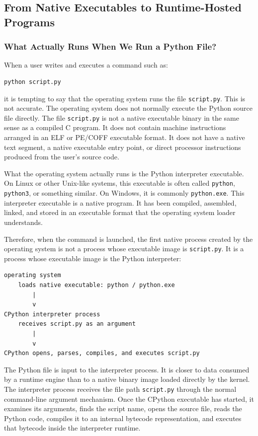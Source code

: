 \documentclass[a4paper,twoside]{report}
\begin{document}
\subsection{From Native Executables to Runtime-Hosted Programs}


\subsubsection{What Actually Runs When We Run a Python File?}

When a user writes and executes a command such as:

\begin{verbatim}
python script.py
\end{verbatim}

it is tempting to say that the operating system runs the file \texttt{script.py}. This is not accurate. The operating system does not normally execute the Python source file directly. The file \texttt{script.py} is not a native executable binary in the same sense as a compiled C program. It does not contain machine instructions arranged in an ELF or PE/COFF executable format. It does not have a native text segment, a native executable entry point, or direct processor instructions produced from the user's source code.

What the operating system actually runs is the Python interpreter executable. On Linux or other Unix-like systems, this executable is often called \texttt{python}, \texttt{python3}, or something similar. On Windows, it is commonly \texttt{python.exe}. This interpreter executable is a native program. It has been compiled, assembled, linked, and stored in an executable format that the operating system loader understands.

Therefore, when the command is launched, the first native process created by the operating system is not a process whose executable image is \texttt{script.py}. It is a process whose executable image is the Python interpreter:

\begin{verbatim}
operating system
    loads native executable: python / python.exe
        |
        v
CPython interpreter process
    receives script.py as an argument
        |
        v
CPython opens, parses, compiles, and executes script.py
\end{verbatim}

The Python file is input to the interpreter process. It is closer to data consumed by a runtime engine than to a native binary image loaded directly by the kernel. The interpreter process receives the file path \texttt{script.py} through the normal command-line argument mechanism. Once the CPython executable has started, it examines its arguments, finds the script name, opens the source file, reads the Python code, compiles it to an internal bytecode representation, and executes that bytecode inside the interpreter runtime.
\end{document}
